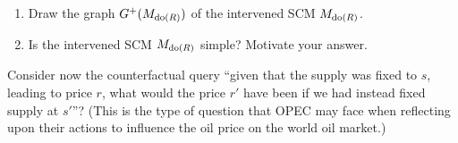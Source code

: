 \begin{enumerate}[resume*]
  \item Draw the graph $G^+(M_{\operatorname{do}(R)})$ of the intervened SCM $M_{\operatorname{do}(R)}$.
  \item Is the intervened SCM $M_{\operatorname{do}(R)}$ simple? Motivate your answer.
\end{enumerate}
Consider now the counterfactual query ``given that the supply was fixed to $s$, leading to price $r$, what would the price $r'$ have been if we had instead fixed supply at $s'$''?
(This is the type of question that OPEC may face when reflecting upon their actions to influence the oil price on the world oil market.)
